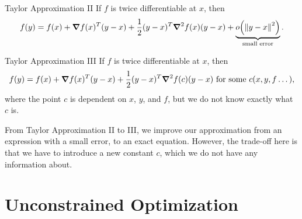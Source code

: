 	\begin{thm}{Taylor Approximation II} 
If $f$ is twice differentiable at $x$, then\[f(y)=f(x)+\grad f(x)^T(y-x)+\dfrac{1}{2}(y-x)^T\grad^2f(x)(y-x)+\underbrace{o\qty(\norm{y-x}^2)}_\text{small error}.\]
\end{thm}
\begin{thm}{Taylor Approximation III}
	If $f$ is twice differentiable at $x$, then \[f(y)=f(x)+\grad f(x)^T(y-x)+\dfrac{1}{2}(y-x)^T\grad^2f(c)(y-x)\text{ for some }c(x,y,f\dots),\] where the point $c$ is dependent on $x$, $y$, and $f$, but we do not know exactly what $c$ is.
\end{thm}
\begin{rmk}
	From Taylor Approximation II to III, we improve our approximation from an expression with a small error, to an exact equation. However, the trade-off here is that we have to introduce a new constant $c$, which we do not have any information about. 	
\end{rmk}


\newpage
\section{Unconstrained Optimization}
